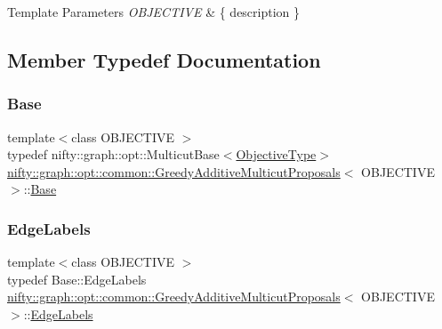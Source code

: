 \begin{DoxyTemplParams}{Template Parameters}
{\em O\+B\+J\+E\+C\+T\+I\+VE} & \{ description \} \\
\hline
\end{DoxyTemplParams}


\subsection{Member Typedef Documentation}
\mbox{\label{classnifty_1_1graph_1_1opt_1_1common_1_1GreedyAdditiveMulticutProposals_af4cc9116e5172d0f8b95d1d059bf437d}} 
\subsubsection{\texorpdfstring{Base}{Base}}
{\footnotesize\ttfamily template$<$class O\+B\+J\+E\+C\+T\+I\+VE $>$ \\
typedef nifty\+::graph\+::opt\+::\+Multicut\+Base$<$\hyperlink{classnifty_1_1graph_1_1opt_1_1common_1_1GreedyAdditiveMulticutProposals_a3e3e6166f8860e862acf00a9d134af54}{Objective\+Type}$>$ \hyperlink{classnifty_1_1graph_1_1opt_1_1common_1_1GreedyAdditiveMulticutProposals}{nifty\+::graph\+::opt\+::common\+::\+Greedy\+Additive\+Multicut\+Proposals}$<$ O\+B\+J\+E\+C\+T\+I\+VE $>$\+::\hyperlink{classnifty_1_1graph_1_1opt_1_1common_1_1GreedyAdditiveMulticutProposals_af4cc9116e5172d0f8b95d1d059bf437d}{Base}}

\mbox{\label{classnifty_1_1graph_1_1opt_1_1common_1_1GreedyAdditiveMulticutProposals_a09e4cb8aea3e3aae593a050b1c55430e}} 
\subsubsection{\texorpdfstring{Edge\+Labels}{EdgeLabels}}
{\footnotesize\ttfamily template$<$class O\+B\+J\+E\+C\+T\+I\+VE $>$ \\
typedef Base\+::\+Edge\+Labels \hyperlink{classnifty_1_1graph_1_1opt_1_1common_1_1GreedyAdditiveMulticutProposals}{nifty\+::graph\+::opt\+::common\+::\+Greedy\+Additive\+Multicut\+Proposals}$<$ O\+B\+J\+E\+C\+T\+I\+VE $>$\+::\hyperlink{classnifty_1_1graph_1_1opt_1_1common_1_1GreedyAdditiveMulticutProposals_a09e4cb8aea3e3aae593a050b1c55430e}{Edge\+Labels}}

